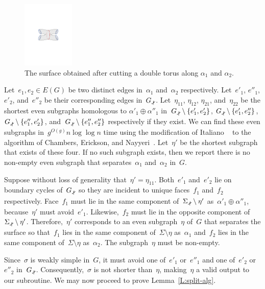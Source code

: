 \documentclass[twoside,leqno,twocolumn]{article}
\def\subsnip{\mathbin{\raisebox{0.15ex}{\rotatebox[origin=c]{60}{\footnotesize\Rightscissors}\!}}}
\def\Gsnip{\mathord{G_{\subsnip}}}
\begin{document}
\begin{figure}[ht]
\centering
\includegraphics[height=1.25in]{Fig/two-pants}
\caption{The surface obtained after cutting a double torus
along $\alpha_1$ and $\alpha_2$.} \label{F:forbidden-pair}
\end{figure}

Let~$e_1,e_2 \in E(G)$ be two distinct edges in~$\alpha_1$ and~$\alpha_2$
respectively. Let~$e'_1$, $e''_1$, $e'_2$, and~$e''_2$ be their corresponding
edges in~$\Gsnip$. Let~$\eta_{11}$, $\eta_{12}$, $\eta_{21}$, and~$\eta_{22}$ be the
shortest even subgraphs homologous to $\alpha'_1 \oplus \alpha''_1$
in~$\Gsnip \setminus \set{e'_1,e'_2}$,
$\Gsnip \setminus \set{e'_1,e''_2}$,
$\Gsnip \setminus \set{e''_1,e'_2}$,
and~$\Gsnip \setminus \set{e''_1,e''_2}$
respectively if they exist.
We can find these even subgraphs in~$g^{O(g)}n \log \log n$ time
using the modification of Italiano \etal~\cite{insw-iamcmf-11}
to the algorithm of Chambers, Erickson, and Nayyeri~\cite{cen-mcshc-09}.
Let~$\eta'$ be the
shortest subgraph that exists of these four. If no such subgraph exists, then we
report there is no non-empty even subgraph that separates~$\alpha_1$
and~$\alpha_2$ in~$G$.

Suppose without loss of generality that~$\eta' = \eta_{11}$. Both~$e'_1$ and~$e'_2$
lie on boundary cycles of~$\Gsnip$ so they are incident to unique
faces~$f_1$ and~$f_2$ respectively. Face~$f_1$ must lie in the same component
of~$\Sigma_{\subsnip} \setminus \eta'$ as~$\alpha'_1 \oplus \alpha''_1$,
because~$\eta'$ must avoid~$e'_1$.
Likewise,~$f_2$ must lie in the opposite component
of~$\Sigma_{\subsnip} \setminus \eta'$.
Therefore,~$\eta'$ corresponds to an even subgraph~$\eta$ of~$G$ that separates the
surface so that~$f_1$ lies in the same component of~$\Sigma \setminus \eta$
as~$\alpha_1$ and~$f_2$ lies in the same component of~$\Sigma \setminus \eta$
as~$\alpha_2$. The subgraph~$\eta$ must be non-empty.

Since~$\sigma$ is weakly simple in~$G$, it must avoid one of~$e'_1$ or~$e''_1$ and
one of~$e'_2$ or~$e''_2$ in~$\Gsnip$. Consequently,~$\sigma$ is not shorter
than~$\eta$, making~$\eta$ a valid output to our subroutine. We may now proceed to
prove Lemma~\ref{L:split-alg}.
\end{document}
